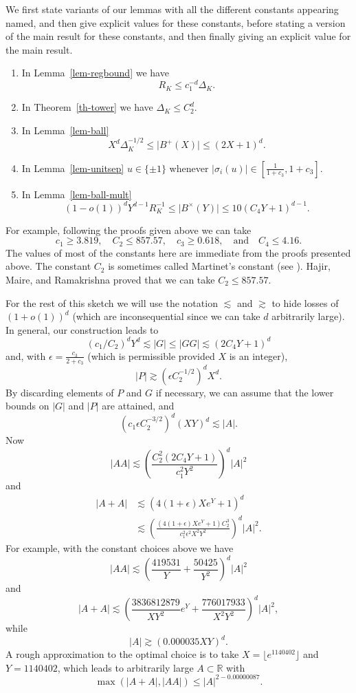 \documentclass{amsart}
\numberwithin{equation}{section}
\newcommand{\ls}{\lesssim}
\newcommand{\gs}{\gtrsim}
\newcommand{\abs}[1]{\mathopen{}\left| #1\mathclose{}\right|}
\newcommand{\brac}[1]{\mathopen{}\left( #1 \mathclose{}\right)}
\newcommand{\bbr}{\mathbb{R}}
\newcommand{\Abs}[1]{\lvert #1\rvert}
\begin{document}
We first state variants of our lemmas with all the different constants appearing named, and then give explicit values for these constants, before stating a version of the main result for these constants, and then finally giving an explicit value for the main result.


\begin{enumerate}
\item In Lemma~\ref{lem-regbound} we have 
\[R_K \leq c_1^{-d}\Delta_K.\]
\item In Theorem~\ref{th-tower} we have $\Delta_K\leq C_2^d$.
\item In Lemma~\ref{lem-ball}
\[X^d\Delta_K^{-1/2}\leq \Abs{B^+(X)}\leq (2X+1)^d.\]
\item In Lemma~\ref{lem-unitsep} $u\in \{\pm 1\}$ whenever $\Abs{\sigma_i(u)}\in [\tfrac{1}{1+c_3},1+c_3]$.
\item In Lemma~\ref{lem-ball-mult}
\[(1-o(1))^dY^{d-1}R_K^{-1}\leq \Abs{B^\times(Y)}\leq 10(C_4Y+1)^{d-1}.\]
\end{enumerate} 

For example, following the proofs given above we can take 
\[c_1\geq 3.819,\quad C_2\leq 857.57, \quad c_3\geq 0.618,\quad\textrm{and}\quad C_4\leq 4.16.\]
The values of most of the constants here are immediate from the proofs presented above. The constant $C_2$ is sometimes called Martinet's constant (see \cite{HaMa01}). Hajir, Maire, and Ramakrishna \cite[\S3.3.3]{hajir2021shafarevich} proved that we can take $C_2 \leq 857.57$.

For the rest of this sketch we will use the notation $\ls$ and $\gs$ to hide losses of $(1+o(1))^d$ (which are inconsequential since we can take $d$ arbitrarily large). In general, our construction leads to
\[(c_1/C_2)^dY^{d}\ls\abs{G}\leq \abs{GG}\ls (2C_4Y+1)^{d}\]
and, with $\epsilon= \tfrac{c_3}{2+c_3}$ (which is permissible provided $X$ is an integer), 
\[\abs{P}\gs(\epsilon C_2^{-1/2})^dX^d.\]
By discarding elements of $P$ and $G$ if necessary, we can assume that the lower bounds on $\abs{G}$ and $\abs{P}$ are attained, and 
\[(c_1\epsilon C_2^{-3/2})^d(XY)^d\ls \abs{A}.\]
Now 
\[\abs{AA}\ls\brac{\frac{C_2^2(2C_4Y+1)}{c_1^2Y^2}}^d\abs{A}^2\]
and 
\begin{align*}
\abs{A+A}
&\ls (4(1+\epsilon)Xe^Y+1)^d\\
&\ls\brac{\frac{(4(1+\epsilon)Xe^Y+1)C_2^3}{c_1^2\epsilon^2X^2Y^2}}^d\abs{A}^2.
\end{align*}
For example, with the constant choices above we have
\[\abs{AA}\ls\brac{\frac{419531}{Y}+\frac{50425}{Y^2}}^d\abs{A}^2\]
and 
\[\abs{A+A}\ls\brac{\frac{3836812879}{XY^2}e^Y+\frac{776017933}{X^2Y^2}}^d\abs{A}^2,\]
while
\[\abs{A}\gs(0.000035XY)^d.\]
A rough approximation to the optimal choice is to take $X=\lfloor e^{1140402}\rfloor$ and $Y=1140402$, which leads to arbitrarily large $A\subset \bbr$ with
\[\max(\abs{A+A},\abs{AA})\leq \abs{A}^{2-0.00000087}.\]
\end{document}
